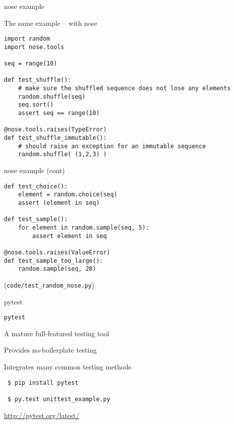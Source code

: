 \documentclass{beamer}
\begin{document}
\begin{frame}[fragile]{nose example}

{\Large The same example -- with nose}

{\small
\begin{verbatim}
import random
import nose.tools

seq = range(10)

def test_shuffle():
    # make sure the shuffled sequence does not lose any elements
    random.shuffle(seq)
    seq.sort()
    assert seq == range(10)

@nose.tools.raises(TypeError)
def test_shuffle_immutable():
    # should raise an exception for an immutable sequence
    random.shuffle( (1,2,3) )
\end{verbatim}
}

\end{frame} 

\begin{frame}[fragile]{nose example (cont) }

{\small
\begin{verbatim}
def test_choice():
    element = random.choice(seq)
    assert (element in seq)

def test_sample():
    for element in random.sample(seq, 5):
        assert element in seq

@nose.tools.raises(ValueError)
def test_sample_too_large():
    random.sample(seq, 20)
\end{verbatim}
}

\vfill
(\verb|code/test_random_nose.py|)

\end{frame} 


\begin{frame}[fragile]{pytest}

{\LARGE \verb|pytest|}

\vfill
{\Large \hspace{0.2in} A mature full-featured testing tool}

\vfill
{\Large \hspace{0.2in} Provides no-boilerplate testing}

\vfill
{\Large \hspace{0.2in} Integrates many common testing methods}

\vfill
\begin{verbatim}
 $ pip install pytest

 $ py.test unittest_example.py 
\end{verbatim}

\vfill
\url{http://pytest.org/latest/}
\end{frame} 
\end{document}
